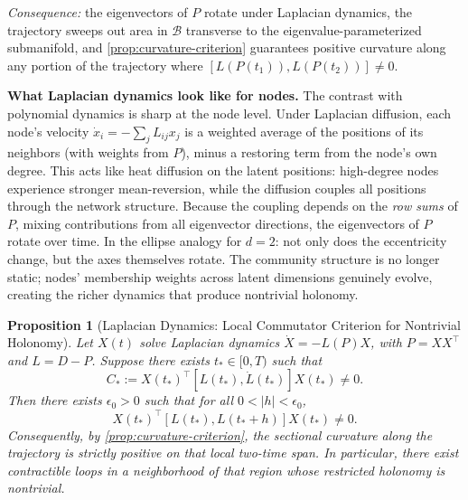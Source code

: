 \documentclass{article}
\theoremstyle{plain}
\newtheorem{proposition}{Proposition}
\theoremstyle{definition}
\theoremstyle{remark}
\begin{document}
\emph{Consequence:} the eigenvectors of $P$ rotate under Laplacian dynamics, the trajectory sweeps out area in $\mathcal{B}$ transverse to the eigenvalue-parameterized submanifold, and \cref{prop:curvature-criterion} guarantees positive curvature along any portion of the trajectory where $[L(P(t_1)), L(P(t_2))] \neq 0$.

\textbf{What Laplacian dynamics look like for nodes.}
The contrast with polynomial dynamics is sharp at the node level.
Under Laplacian diffusion, each node's velocity $\dot{x}_i = -\sum_j L_{ij} x_j$ is a weighted average of the positions of its neighbors (with weights from $P$), minus a restoring term from the node's own degree.
This acts like heat diffusion on the latent positions: high-degree nodes experience stronger mean-reversion, while the diffusion couples all positions through the network structure.
Because the coupling depends on the \emph{row sums} of $P$, mixing contributions from all eigenvector directions, the eigenvectors of $P$ rotate over time.
In the ellipse analogy for $d = 2$: not only does the eccentricity change, but the axes themselves rotate.
The community structure is no longer static; nodes' membership weights across latent dimensions genuinely evolve, creating the richer dynamics that produce nontrivial holonomy.

\begin{proposition}[Laplacian Dynamics: Local Commutator Criterion for Nontrivial Holonomy]\label{prop:laplacian-holonomy}
Let $X(t)$ solve Laplacian dynamics $\dot{X} = -L(P) X$, with $P = XX^\top$ and $L = D - P$.
Suppose there exists $t_* \in [0,T)$ such that
\begin{equation}
C_* := X(t_*)^\top [L(t_*), \dot{L}(t_*)] X(t_*) \neq 0.
\end{equation}
Then there exists $\epsilon_0 > 0$ such that for all $0 < |h| < \epsilon_0$,
\begin{equation}
X(t_*)^\top [L(t_*), L(t_* + h)] X(t_*) \neq 0.
\end{equation}
Consequently, by \cref{prop:curvature-criterion}, the sectional curvature along the trajectory is strictly positive on that local two-time span.
In particular, there exist contractible loops in a neighborhood of that region whose restricted holonomy is nontrivial.
\end{proposition}
\end{document}
